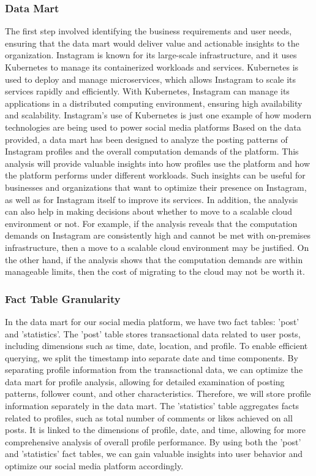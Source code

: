 \documentclass[conference]{IEEEtran}
\begin{document}
\subsubsection{Data Mart}
The first step involved identifying the business requirements and user needs, ensuring that the data mart would deliver value and actionable insights to the organization. Instagram is known for its large-scale infrastructure, and it uses Kubernetes to manage its containerized workloads and services. Kubernetes is used to deploy and manage microservices, which allows Instagram to scale its services rapidly and efficiently. With Kubernetes, Instagram can manage its applications in a distributed computing environment, ensuring high availability and scalability. Instagram's use of Kubernetes is just one example of how modern technologies are being used to power social media platforms \cite{Janakiram:2019}
Based on the data provided, a data mart has been designed to analyze the posting patterns of Instagram profiles and the overall computation demands of the platform. This analysis will provide valuable insights into how profiles use the platform and how the platform performs under different workloads. Such insights can be useful for businesses and organizations that want to optimize their presence on Instagram, as well as for Instagram itself to improve its services.
In addition, the analysis can also help in making decisions about whether to move to a scalable cloud environment or not. For example, if the analysis reveals that the computation demands on Instagram are consistently high and cannot be met with on-premises infrastructure, then a move to a scalable cloud environment may be justified. On the other hand, if the analysis shows that the computation demands are within manageable limits, then the cost of migrating to the cloud may not be worth it.
\\
\subsubsection{Fact Table Granularity}
In the data mart for our social media platform, we have two fact tables: 'post' and 'statistics'. The 'post' table stores transactional data related to user posts, including dimensions such as time, date, location, and profile. To enable efficient querying, we split the timestamp into separate date and time components. By separating profile information from the transactional data, we can optimize the data mart for profile analysis, allowing for detailed examination of posting patterns, follower count, and other characteristics. Therefore, we will store profile information separately in the data mart. The 'statistics' table aggregates facts related to profiles, such as total number of comments or likes achieved on all posts. It is linked to the dimensions of profile, date, and time, allowing for more comprehensive analysis of overall profile performance. By using both the 'post' and 'statistics' fact tables, we can gain valuable insights into user behavior and optimize our social media platform accordingly.
\\
\end{document}
